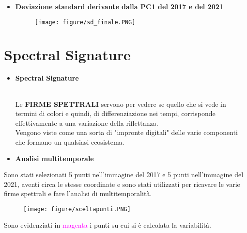 \documentclass[10pt]{beamer}
\begin{document}
\begin{frame} {}
    \begin{itemize}
      \item \textbf{Deviazione standard derivante dalla PC1 del 2017 e del 2021}
    \begin{figure}
      \bigskip 
      \texttt{[image: figure/sd\_finale.PNG]}
    \end{figure}
    \end{itemize}
\end{frame}


\section {Spectral Signature}
\begin{frame}
    \begin{itemize}
      \item \textbf{Spectral Signature}
      {\\Le \textbf{FIRME SPETTRALI} servono per vedere se quello che si vede in termini di colori e quindi, di differenziazione nei tempi, corrisponde effettivamente a una variazione della riflettanza.
      \bigskip 
      \\ Vengono viste come una sorta di "impronte digitali" delle varie componenti che formano un qualsiasi ecosistema.
\par} 
    \end{itemize}
\end{frame}


\begin{frame}
    \begin{itemize}
      \item \textbf{Analisi multitemporale}
    \end{itemize}
      \centering
      {Sono stati selezionati 5 punti nell'immagine del 2017 e 5 punti nell'immagine del 2021, aventi circa le stesse coordinate e sono stati utilizzati per ricavare le varie firme spettrali e fare l'analisi di multitemporalità.}
    \begin{figure}
      \bigskip 
      \texttt{[image: figure/sceltapunti.PNG]}
    \end{figure}
     {\scriptsize Sono evidenziati in \textcolor{magenta}{magenta} i punti su cui si è calcolata la variabilità.\par}
\end{frame}
\end{document}
